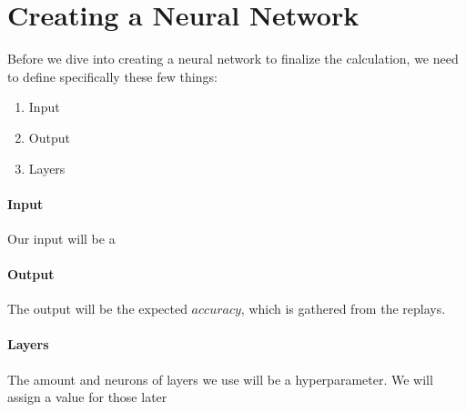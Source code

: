 

\section{Creating a Neural Network}

Before we dive into creating a neural network to finalize the calculation, we need to define specifically these few things:

\begin{enumerate}
	\item Input
	\item Output
	\item Layers
\end{enumerate}

\paragraph{Input} Our input will be a 

\paragraph{Output} The output will be the expected $accuracy$, which is gathered from the replays.

\paragraph{Layers} The amount and neurons of layers we use will be a hyperparameter. We will assign a value for those later



